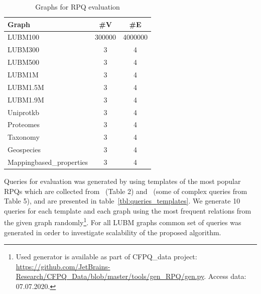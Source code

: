 \begin{table}
\begin{tabular}{|l|c|c|}
\hline
Graph & \#V & \#E \\
\hline
\hline 
LUBM100  & 300000 & 4000000 \\
LUBM300  & 3 & 4 \\
LUBM500  & 3 & 4 \\
LUBM1M   & 3 & 4 \\
LUBM1.5M & 3 & 4 \\
LUBM1.9M & 3 & 4 \\
\hline
Uniprotkb & 3 & 4 \\
Proteomes & 3 & 4 \\
Taxonomy & 3 & 4 \\
\hline
Geospecies & 3 & 4 \\
Mappingbased\_properties & 3 & 4 \\
\hline
\end{tabular}
\caption{Graphs for RPQ evaluation}
\label{tbl:graphs_for_rpq}
\end{table}


Queries for evaluation was generated by using templates of the most popular RPQs which are collected from~
\cite{Pacaci2020RegularPQ} (Table 2) and~\cite{Wang2019} (some of complex queries from Table 5), and are presented in table~\ref{tbl:queries_templates}.
We generate 10 queries for each template and each graph using the most frequent relations from the given graph randomly\footnote{Used generator is available as part of CFPQ\_data project: \url{https://github.com/JetBrains-Research/CFPQ_Data/blob/master/tools/gen_RPQ/gen.py}. Access data: 07.07.2020.}. 
For all LUBM graphs common set of queries was generated in order to investigate scalability of the proposed algorithm.

